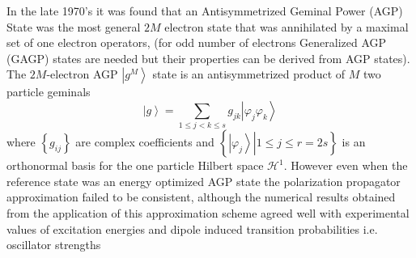 \documentclass[aps,preprint]{revtex4}%
\begin{document}
In the late 1970's it was found \cite{Weiner80}\cite{Weiner80a}%
\cite{Goscinski80} \cite{Linderberg77}\cite{Ohrn79} that an Antisymmetrized
Geminal Power (AGP) State was the most general $2M$ electron state that was
annihilated by a maximal set of one electron operators, (for odd number of
electrons Generalized AGP (GAGP) states \cite{GAGP} are needed but their
properties can be derived from AGP states). The $2M$-electron AGP $\left\vert
g^{M}\right\rangle $ state is an antisymmetrized product of $M$ two particle
geminals
\begin{equation}
\left\vert g\right\rangle =\sum_{1\leq j<k\leq s}g_{jk}\left\vert \varphi
_{j}\varphi_{k}\right\rangle
\end{equation}
where $\left\{  g_{ij}\right\}  $ are complex coefficients and $\left\{
\left.  \left\vert \varphi_{j}\right\rangle \right\vert 1\leq j\leq
r=2s\right\}  $ is an orthonormal basis for the one particle Hilbert space
$\mathcal{H}^{1}.$ However even when the reference state was an energy
optimized AGP state the polarization propagator approximation failed to be
consistent, although the numerical results obtained from the application of
this approximation scheme agreed well with experimental values of excitation
energies and dipole induced transition probabilities i.e. oscillator
strengths\cite{Sangfelt85}\cite{Sangfelt84}\cite{Elander83}\cite{Goscinski82}%
\cite{Weiner83}\cite{Sangfelt81} \cite{Weiner87}\cite{Sangfelt87}%
\cite{Ohrn85}\cite{Weiner85}\cite{Weiner84a}\cite{Jensen82}\cite{Jorgen83}
\end{document}
